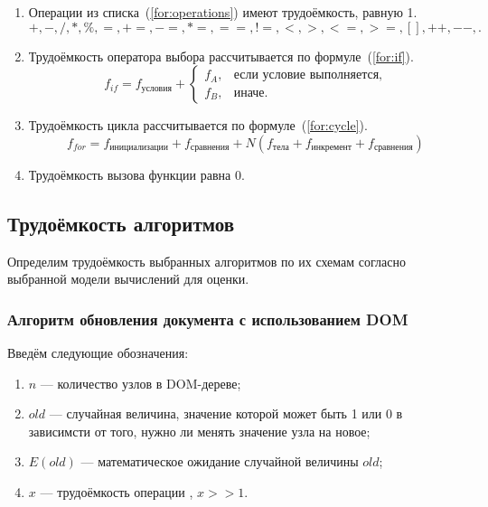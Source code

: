 \begin{enumerate}[label=\arabic*)]
	\item Операции из списка~(\ref{for:operations}) имеют трудоёмкость, равную 1.
	\begin{equation}
		\label{for:operations}
		+, -, /, *, \%, =, +=, -=, *=, ==, !=, <, >, <=, >=, [], ++, {-}-, . 
	\end{equation}
	\item Трудоёмкость оператора выбора  рассчитывается по формуле~(\ref{for:if}).
	\begin{equation}
		\label{for:if}
		f_{if} = f_{\text{условия}} +
		\begin{cases}
			f_A, & \text{если условие выполняется,}\\
			f_B, & \text{иначе.}
		\end{cases}
	\end{equation}
	\item Трудоёмкость цикла рассчитывается по формуле~(\ref{for:cycle}).
	\begin{equation}
		\label{for:cycle}
		f_{for} = f_{\text{инициализации}} + f_{\text{сравнения}} + N(f_{\text{тела}} + f_{\text{инкремент}} + f_{\text{сравнения}})
	\end{equation}
	\item Трудоёмкость вызова функции равна 0.
\end{enumerate}


\subsection{Трудоёмкость алгоритмов}

Определим трудоёмкость выбранных алгоритмов по их схемам согласно выбранной модели вычислений для оценки.

\subsubsection{Алгоритм обновления документа с использованием DOM}

Введём следующие обозначения:
\begin{enumerate}[label=\arabic*)]
	\item $n$ --- количество узлов в DOM-дереве;
	\item $old$ --- случайная величина, значение которой может быть 1 или 0 в зависимсти от того, нужно ли менять значение узла на новое;
	\item $E(old)$ --- математическое ожидание случайной величины $old$;
	\item $x$ --- трудоёмкость операции , $x >> 1$.
\end{enumerate}

